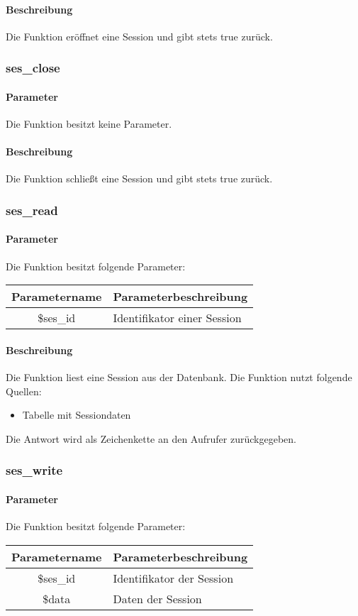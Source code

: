 \paragraph{Beschreibung} Die Funktion eröffnet eine Session und gibt stets {\glqq true\grqq} zurück.
\subsubsection{ses\_close}
\paragraph{Parameter} Die Funktion besitzt keine Parameter.
\paragraph{Beschreibung} Die Funktion schließt eine Session und gibt stets {\glqq true\grqq} zurück.
\subsubsection{ses\_read}
\paragraph{Parameter} Die Funktion besitzt folgende Parameter:
\begin{table}[H]
	\begin{tabular}{|c|p{11cm}|}
		\hline
		\textbf{Parametername} & \textbf{Parameterbeschreibung} \\ \hline
		\$ses\_id & Identifikator einer Session \\ \hline
	\end{tabular}
\end{table}
\paragraph{Beschreibung} Die Funktion liest eine Session aus der Datenbank. Die Funktion nutzt folgende Quellen:
\begin{itemize}
	\item Tabelle mit Sessiondaten
\end{itemize}
Die Antwort wird als Zeichenkette an den Aufrufer zurückgegeben.
\subsubsection{ses\_write}
\paragraph{Parameter} Die Funktion besitzt folgende Parameter:
\begin{table}[H]
	\begin{tabular}{|c|p{11cm}|}
		\hline
		\textbf{Parametername} & \textbf{Parameterbeschreibung} \\ \hline
		\$ses\_id & Identifikator der Session \\ \hline
		\$data    & Daten der Session \\ \hline
	\end{tabular}
\end{table}
